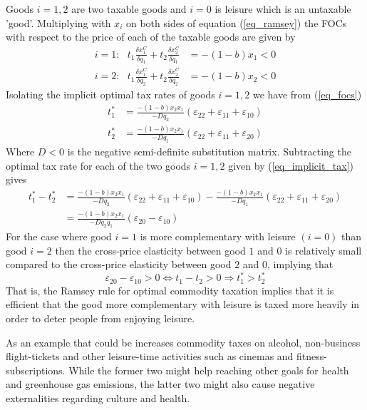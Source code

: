 Goods $i=1,2$ are two taxable goods and $i=0$ is leisure which is an untaxable 'good'. Multiplying with $x_i$ on both sides of equation (\ref{eq_ramsey}) the FOCs with respect to the price of each of the taxable goods are given by
\begin{equation}
  \begin{split}
    i=1:\ \ \ t_1\frac{\delta x_1^C}{\delta q_1}+t_2\frac{\delta x_2^C}{\delta q_1}&=-(1-b)x_1<0\\
    i=2:\ \ \ t_1\frac{\delta x_1^C}{\delta q_2}+t_2\frac{\delta x_2^C}{\delta q_2}&=-(1-b)x_2<0
    \label{eq_focs}
  \end{split}
\end{equation}
Isolating the implicit optimal tax rates of goods $i=1,2$ we have from (\ref{eq_focs})
\begin{equation}
  \begin{split}
    t_1^{*}&=\frac{-(1-b)x_2x_1}{-Dq_2}(\varepsilon_{22}+\varepsilon_{11}+\varepsilon_{10})\\
    t_2^{*}&=\frac{-(1-b)x_2x_1}{-Dq_1}(\varepsilon_{22}+\varepsilon_{11}+\varepsilon_{20})
    \label{eq_implicit_tax}
  \end{split}
\end{equation}
Where $D<0$ is the negative semi-definite substitution matrix. Subtracting the optimal tax rate for each of the two goods $i=1,2$ given by (\ref{eq_implicit_tax}) gives
\begin{equation}
  \begin{split}
    t_1^{*}-t_2^{*}&=\frac{-(1-b)x_2x_1}{-Dq_2}(\varepsilon_{22}+\varepsilon_{11}+\varepsilon_{10})-\frac{-(1-b)x_2x_1}{-Dq_1}(\varepsilon_{22}+\varepsilon_{11}+\varepsilon_{20})\\
    &=\frac{-(1-b)x_2x_1}{-Dq_2q_1}(\varepsilon_{20}-\varepsilon_{10})
    \label{eq_implicit_tax}
  \end{split}
\end{equation}
For the case where good $i=1$ is more complementary with leisure $(i=0)$ than good $i=2$ then the cross-price elasticity between good $1$ and $0$ is relatively small compared to the cross-price elasticity between good $2$ and $0$, implying that
\begin{equation}
  \varepsilon_{20}-\varepsilon_{10}>0\Leftrightarrow t_1-t_2>0\Rightarrow t_1^{*}>t_2^{*}
\end{equation}
That is, the Ramsey rule for optimal commodity taxation implies that it is efficient that the good more complementary with leisure is taxed more heavily in order to deter people from enjoying leisure.

As an example that could be increases commodity taxes on alcohol, non-business flight-tickets and other leisure-time activities such as cinemas and fitness-subscriptions. While the former two might help reaching other goals for health and greenhouse gas emissions, the latter two might also cause negative externalities regarding culture and health.
